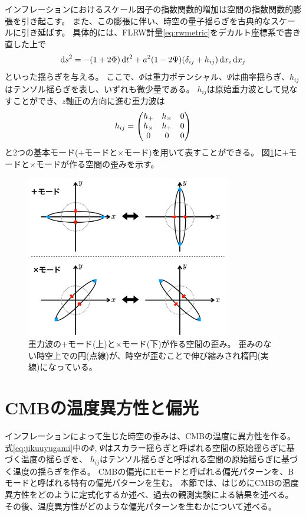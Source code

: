 \documentclass[../../main.tex]{subfiles}
\begin{document}
インフレーションにおけるスケール因子の指数関数的増加は空間の指数関数的膨張を引き起こす。
また、この膨張に伴い、時空の量子揺らぎを古典的なスケールに引き延ばす。
具体的には、FLRW計量\eqref{eq:rwmetric}をデカルト座標系で書き直した上で
\begin{equation}
    \label{eq:jikuuyugami}
    \dd{s}^2 = -\qty(1+2\Phi)\dd{t}^2 + a^2\qty(1-2\Psi)\qty(\delta_{ij}+h_{ij})\dd{x_i}\dd{x_j}
\end{equation}
といった揺らぎを与える。
ここで、$\Phi$は重力ポテンシャル、$\Psi$は曲率揺らぎ、$h_{ij}$はテンソル揺らぎを表し、いずれも微少量である。
$h_{ij}$は原始重力波として見なすことができ、$z$軸正の方向に進む重力波は
\begin{equation}
    h_{ij} = \mqty(h_{+} & h_{\times} & 0\\
                   h_{\times} & h_{+} & 0\\
                   0 & 0 & 0
                   )
\end{equation}
と2つの基本モード($+$モードと$\times$モード)を用いて表すことができる。
図\ref{fig:gravitational_wave}に$+$モードと$\times$モードが作る空間の歪みを示す。
\begin{figure}[H]
    \centering
    \includegraphics[width=0.8\textwidth]{intro/gravitational_wave.pdf}
    \caption{重力波の$+$モード(上)と$\times$モード(下)が作る空間の歪み。
    歪みのない時空上での円(点線)が、時空が歪むことで伸び縮みされ楕円(実線)になっている。}
    \label{fig:gravitational_wave}
\end{figure}

\section{CMBの温度異方性と偏光}
インフレーションによって生じた時空の歪みは、CMBの温度に異方性を作る\cite{1967ApJ...147...73S}。
式\eqref{eq:jikuuyugami}中の$\Phi,\,\Psi$はスカラー揺らぎと呼ばれる空間の原始揺らぎに基づく温度の揺らぎを、
$h_{ij}$はテンソル揺らぎと呼ばれる空間の原始揺らぎに基づく温度の揺らぎを作る。
CMBの偏光にEモードと呼ばれる偏光パターンを、Bモードと呼ばれる特有の偏光パターンを生む。
本節では、はじめにCMBの温度異方性をどのように定式化するか述べ、過去の観測実験による結果を述べる。
その後、温度異方性がどのような偏光パターンを生むかについて述べる。
\end{document}
